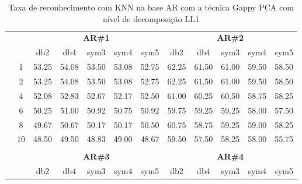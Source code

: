 \begin{table}[htpb]
	\centering
    \normalsize
	\caption{Taxa de reconhecimento com KNN na base AR com a técnica Gappy PCA com nível de decomposição LL1}
	\begin{tabular}{|c|c|c c c c c|c c c c c|}
\cline{3-12}
\multicolumn{2}{c|}{\multirow{2}{*}{}} & \multicolumn{5}{c|}{\textbf{AR\#1}}  & \multicolumn{5}{c|}{\textbf{AR\#2}} \\\cline{3-12}

\multicolumn{2}{c|}{}  & db2 & db4 & sym3 & sym4 & sym5 & db2 & db4& sym3 & sym4 & sym5 \\\hline

\multicolumn{1}{|c|}{ \multirow{5}{*}{\rotatebox[origin=c]{90}{\textbf{K-vizinhos}}} }
&1	&53.25	&54.08	&53.50	&53.08	&52.75	&62.25	&61.50&	61.00&	59.50	&58.50	\\\cline{2-12}
&2	&53.25	&54.08	&53.50	&53.08	&52.75	&62.25	&61.50&	61.00&	59.50	&58.50	\\\cline{2-12}
&4	&52.08	&52.83	&52.67	&52.17	&52.50	&61.00	&60.25&	60.50&	58.75	&58.25	\\\cline{2-12}
&6	&50.25	&51.00	&50.92	&50.75	&50.92	&59.75	&59.25&	59.25&	58.00	&57.50	\\\cline{2-12}
&8	&49.67	&50.67	&50.17	&50.17	&50.50	&60.75	&58.75&	59.25&	59.00	&58.25	\\\cline{2-12}
&10	&48.50	&49.50	&48.83	&49.00	&48.67	&59.50	&57.50&	58.25&	58.00	&55.75	


\\ \midrule
\multicolumn{12}{c}{}\\ 




\cline{3-12}
\multicolumn{2}{c}{} & \multicolumn{5}{|c|}{\textbf{AR\#3}}  & \multicolumn{5}{c|}{\textbf{AR\#4}} \\\cline{3-12}
\multicolumn{2}{c}{}  & \multicolumn{1}{|c}{db2} & db4 & sym3 & sym4 & sym5 & db2 & db4& sym3 & sym4 & sym5 \\\hline


\end{tabular}
\end{table}
